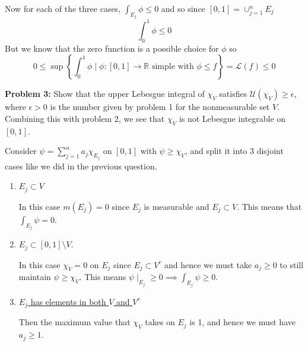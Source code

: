 \documentclass[11pt]{article}
\newcommand{\R}{\mathbb{R}}
\begin{document}
    Now for each of the three cases, $\int_{E_j} \phi \leq 0$ and so since $[0,1] = \cup_{j=1}^{n} E_j$
    \[
        \int_{0}^{1} \phi \leq 0
    \]
    But we know that the zero function is a possible choice for $\phi$ so
    \[
         0 \leq \sup \left\{  \int_{0}^{1}  \phi \mid \phi: [0,1] \rightarrow \R \text{ simple with } \phi \leq f \right\} =  \mathcal{L}(f) \leq 0
    \]

    \clearpage

    \begin{mybox}
        \textbf{Problem 3:} Show that the upper Lebesgue integral of $\chi_V$ satisfies $\mathcal{U}(\chi_V) \geq \epsilon$, where $\epsilon > 0$ is the number given by problem 1 for the nonmeasurable set $V$.
        Combining this with problem 2, we see that $\chi_V$ is not Lebesgue integrable on $[0,1]$.
    \end{mybox}

    Consider $\psi = \sum_{j=1}^{n} a_j \chi_{E_j}$ on $[0,1]$ with $\psi \geq \chi_{V}$, and split it into 3 disjoint cases like we did in the previous question.
    \begin{enumerate}
        \item \underline{$E_j \subset V$}

        In this case $m(E_j) = 0$ since $E_j$ is measurable and $E_j \subset V$.
        This means that $\int_{E_j} \psi = 0$.
        \item \underline{$E_j \subset [0,1] \setminus V$}.

        In this case $\chi_V = 0$ on $E_j$ since $E_j \subset V^c$ and hence we must take $a_j \geq 0$ to still maintain $\psi \geq \chi_V$.
        This means $\psi \mid_{E_j} \geq 0 \implies \int_{E_j} \psi \geq 0$.
        \item \underline{$E_j$ has elements in both $V$ and $V^c$}

        Then the maximum value that $\chi_V$ takes on $E_j$ is 1, and hence we must have $a_j \geq 1$.
    \end{enumerate}
\end{document}
